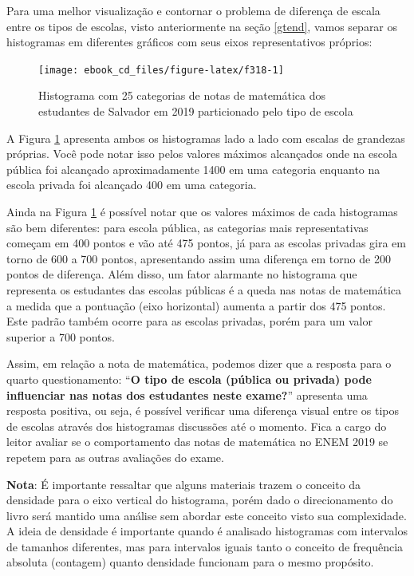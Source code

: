 \documentclass[
  portuguese,
  oneside]{book}
\begin{document}
Para uma melhor visualização e contornar o problema de diferença de escala entre os tipos de escolas, visto anteriormente na seção \ref{gtend}, vamos separar os histogramas em diferentes gráficos com seus eixos representativos próprios:

\begin{figure}

{\centering \texttt{[image: ebook\_cd\_files/figure-latex/f318-1]} 

}

\caption{Histograma com 25 categorias de notas de matemática dos estudantes de Salvador em 2019 particionado pelo tipo de escola}\label{fig:f318}
\end{figure}

A Figura \ref{fig:f318} apresenta ambos os histogramas lado a lado com escalas de grandezas próprias. Você pode notar isso pelos valores máximos alcançados onde na escola pública foi alcançado aproximadamente 1400 em uma categoria enquanto na escola privada foi alcançado 400 em uma categoria.

Ainda na Figura \ref{fig:f318} é possível notar que os valores máximos de cada histogramas são bem diferentes: para escola pública, as categorias mais representativas começam em 400 pontos e vão até 475 pontos, já para as escolas privadas gira em torno de 600 a 700 pontos, apresentando assim uma diferença em torno de 200 pontos de diferença. Além disso, um fator alarmante no histograma que representa os estudantes das escolas públicas é a queda nas notas de matemática a medida que a pontuação (eixo horizontal) aumenta a partir dos 475 pontos. Este padrão também ocorre para as escolas privadas, porém para um valor superior a 700 pontos.

Assim, em relação a nota de matemática, podemos dizer que a resposta para o quarto questionamento: ``\textbf{O tipo de escola (pública ou privada) pode influenciar nas notas dos estudantes neste exame?}'' apresenta uma resposta positiva, ou seja, é possível verificar uma diferença visual entre os tipos de escolas através dos histogramas discussões até o momento. Fica a cargo do leitor avaliar se o comportamento das notas de matemática no ENEM 2019 se repetem para as outras avaliações do exame.

\textbf{Nota}: É importante ressaltar que alguns materiais trazem o conceito da densidade para o eixo vertical do histograma, porém dado o direcionamento do livro será mantido uma análise sem abordar este conceito visto sua complexidade. A ideia de densidade é importante quando é analisado histogramas com intervalos de tamanhos diferentes, mas para intervalos iguais tanto o conceito de frequência absoluta (contagem) quanto densidade funcionam para o mesmo propósito.
\end{document}
